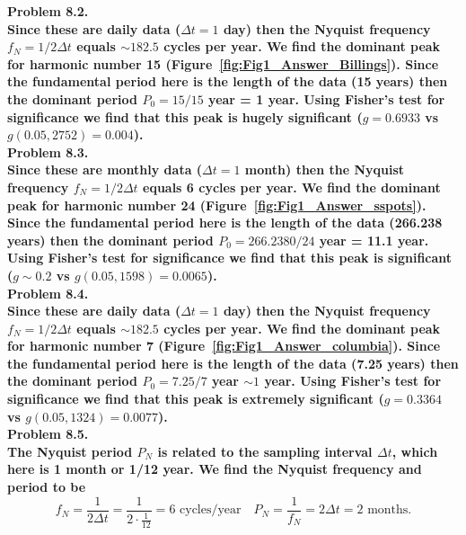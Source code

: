 \noindent
\bf{Problem 8.2.} \\

Since these are daily data ($\Delta t = 1$ day) then the Nyquist frequency $f_N = 1/2\Delta t$ equals
$\sim 182.5$ cycles per year.  We find the dominant peak for harmonic number 15 (Figure~\ref{fig:Fig1_Answer_Billings}).
Since the fundamental period here
is the length of the data (15 years) then the dominant period $P_0 = 15/15$ year = 1 year. Using Fisher's
test for significance we find that this peak is hugely significant ($g = 0.6933$ vs $g(0.05,2752) = 0.004$). \\


\noindent
\bf{Problem 8.3.} \\

Since these are monthly data ($\Delta t = 1$ month) then the Nyquist frequency $f_N = 1/2\Delta t$ equals
6 cycles per year.  We find the dominant peak for harmonic number 24 (Figure~\ref{fig:Fig1_Answer_sspots}).  Since the fundamental period here
is the length of the data (266.238 years) then the dominant period $P_0 = 266.2380/24$ year = 11.1 year. Using Fisher's
test for significance we find that this peak is significant ($g \sim 0.2$ vs $g(0.05,1598) = 0.0065$). \\


\noindent
\bf{Problem 8.4.} \\

Since these are daily data ($\Delta t = 1$ day) then the Nyquist frequency $f_N = 1/2\Delta t$ equals
$\sim 182.5$ cycles per year.  We find the dominant peak for harmonic number 7 (Figure~\ref{fig:Fig1_Answer_columbia}).
Since the fundamental period here
is the length of the data (7.25 years) then the dominant period $P_0 = 7.25/7$ year $\sim 1$ year. Using Fisher's
test for significance we find that this peak is extremely significant ($g = 0.3364$ vs $g(0.05,1324) = 0.0077$). \\


\noindent
\bf{Problem 8.5.} \\

The Nyquist period $P_N$ is related to the sampling interval $\Delta t$, which here is 1 month or 1/12 year.
We find the Nyquist frequency and period to be
$$
f_N = \frac{1}{2 \Delta t} = \frac{1}{2 \cdot \frac{1}{12}} = 6 \mbox{ cycles/year}
\quad P_N = \frac{1}{f_N} = 2\Delta t = 2 \mbox{ months.}
$$

